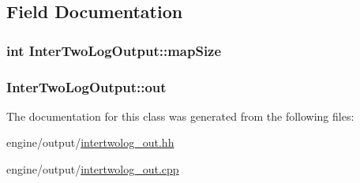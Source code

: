 \subsection{Field Documentation}
\hypertarget{classInterTwoLogOutput_abb92f43d8630b9695545b28fdece04f5}{
\subsubsection[{mapSize}]{\setlength{\rightskip}{0pt plus 5cm}int {\bf InterTwoLogOutput::mapSize}}}
\label{classInterTwoLogOutput_abb92f43d8630b9695545b28fdece04f5}
\hypertarget{classInterTwoLogOutput_a66141117813508a67681b020e5113e7e}{
\subsubsection[{out}]{ {\bf InterTwoLogOutput::out}}}
\label{classInterTwoLogOutput_a66141117813508a67681b020e5113e7e}


The documentation for this class was generated from the following files:\begin{DoxyCompactItemize}
\item 
engine/output/\hyperlink{intertwolog__out_8hh}{intertwolog\_\-out.hh}\item 
engine/output/\hyperlink{intertwolog__out_8cpp}{intertwolog\_\-out.cpp}\end{DoxyCompactItemize}
